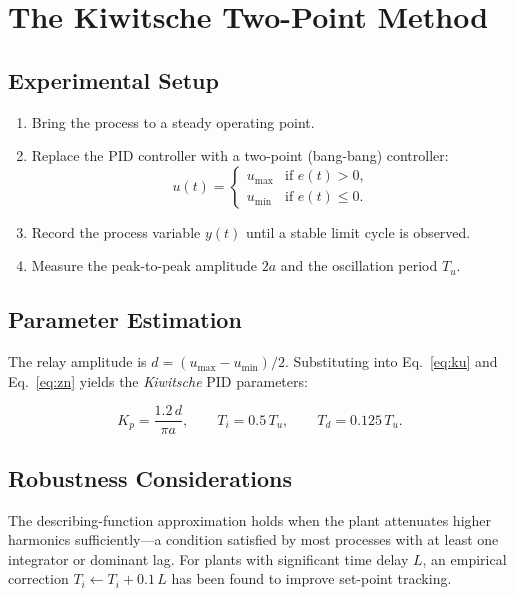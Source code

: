 \documentclass[12pt,a4paper]{article}
\begin{document}
\section{The Kiwitsche Two-Point Method}
\label{sec:method}

\subsection{Experimental Setup}

\begin{enumerate}
  \item Bring the process to a steady operating point.
  \item Replace the PID controller with a two-point (bang-bang) controller:
        \[
          u(t) = \begin{cases} u_{\max} & \text{if } e(t) > 0, \\ u_{\min} & \text{if } e(t) \le 0. \end{cases}
        \]
  \item Record the process variable $y(t)$ until a stable limit cycle is observed.
  \item Measure the peak-to-peak amplitude $2a$ and the oscillation period $T_u$.
\end{enumerate}

\subsection{Parameter Estimation}

The relay amplitude is $d = (u_{\max} - u_{\min})/2$.  Substituting into
Eq.~\eqref{eq:ku} and Eq.~\eqref{eq:zn} yields the \emph{Kiwitsche} PID parameters:

\begin{equation}
  \boxed{K_p = \frac{1.2\,d}{\pi a}, \qquad T_i = 0.5\,T_u, \qquad T_d = 0.125\,T_u.}
  \label{eq:kiwitsche}
\end{equation}

\subsection{Robustness Considerations}

The describing-function approximation holds when the plant attenuates higher harmonics
sufficiently---a condition satisfied by most processes with at least one integrator or
dominant lag.  For plants with significant time delay $L$, an empirical correction
$T_i \leftarrow T_i + 0.1\,L$ has been found to improve set-point tracking.
\end{document}
